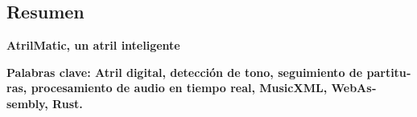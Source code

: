 \begin{otherlanguage}{spanish}
\chapter*{Resumen}
\thispagestyle{plain}

\begin{center}
{\Large\bfseries
AtrilMatic, un atril inteligente
\par}
\end{center}

\vspace{0.8cm}



\vfill

\begin{center}
\textbf{Palabras clave: Atril digital, detección de tono,
seguimiento de partituras, procesamiento de audio en tiempo real,
MusicXML, WebAssembly, Rust.}
\end{center}
\end{otherlanguage}